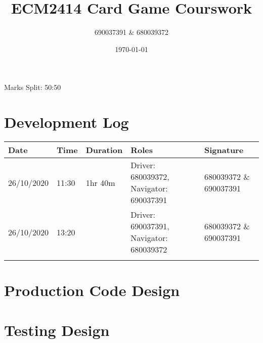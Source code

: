 \documentclass[a4paper, 11pt] {article}
\begin{document}
\title{ECM2414 Card Game Courswork}
\author{690037391 \& 680039372}
\date{\today}
\maketitle
	\begin{center}
		Marks Split: 50:50
	\end{center}
\pagebreak
\section*{Development Log}
\FloatBarrier
\begin{table}[]
\begin{tabular}{|l|l|l|l|l|}
\hline
Date & Time & Duration & Roles & Signature \\ \hline
 26/10/2020  & 11:30 & 1hr 40m & Driver: 680039372, Navigator: 690037391 & 680039372 \& 690037391 \\ \hline
 26/10/2020 & 13:20 &          &  Driver: 690037391, Navigator: 680039372 & 680039372 \& 690037391 \\ \hline
     &      &          &       &           \\ \hline
\end{tabular}
\end{table}
\pagebreak
\section*{Production Code Design}
\pagebreak
	\section*{Testing Design}
\end{document}
